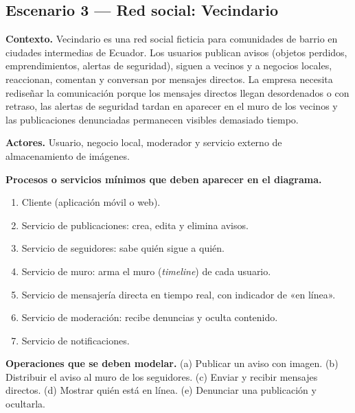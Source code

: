 \documentclass[10pt]{article}
\begin{document}
\subsection{Escenario 3 --- Red social: Vecindario}

\textbf{Contexto.} Vecindario es una red social ficticia para comunidades de barrio en ciudades intermedias de Ecuador. Los usuarios publican avisos (objetos perdidos, emprendimientos, alertas de seguridad), siguen a vecinos y a negocios locales, reaccionan, comentan y conversan por mensajes directos. La empresa necesita rediseñar la comunicación porque los mensajes directos llegan desordenados o con retraso, las alertas de seguridad tardan en aparecer en el muro de los vecinos y las publicaciones denunciadas permanecen visibles demasiado tiempo.

\textbf{Actores.} Usuario, negocio local, moderador y servicio externo de almacenamiento de imágenes.

\textbf{Procesos o servicios mínimos que deben aparecer en el diagrama.}
\begin{enumerate}[leftmargin=1.6em]
	\item Cliente (aplicación móvil o web).
	\item Servicio de publicaciones: crea, edita y elimina avisos.
	\item Servicio de seguidores: sabe quién sigue a quién.
	\item Servicio de muro: arma el muro (\emph{timeline}) de cada usuario.
	\item Servicio de mensajería directa en tiempo real, con indicador de «en línea».
	\item Servicio de moderación: recibe denuncias y oculta contenido.
	\item Servicio de notificaciones.
\end{enumerate}

\textbf{Operaciones que se deben modelar.} (a) Publicar un aviso con imagen. (b) Distribuir el aviso al muro de los seguidores. (c) Enviar y recibir mensajes directos. (d) Mostrar quién está en línea. (e) Denunciar una publicación y ocultarla.
\end{document}
